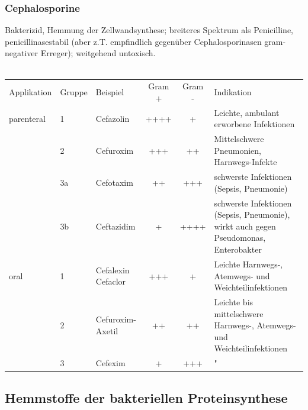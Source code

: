 \documentclass[10pt,a4paper]{report}
\begin{document}
\subsubsection{Cephalosporine} %
\label{ssub:cephalosporine}
Bakterizid, Hemmung der Zellwandsynthese; breiteres Spektrum als Penicilline, penicillinasestabil (aber z.T. empfindlich gegenüber Cephalosporinasen gram-negativer Erreger); weitgehend untoxisch. \\ \\
\begin{tabularx}{\textwidth}{lllccX}
Applikation&Gruppe&Beispiel&Gram +&Gram -&Indikation\\
parenteral&1&Cefazolin&++++&+&Leichte, ambulant erworbene Infektionen\\
&2&Cefuroxim&+++&++&Mittelschwere Pneumonien, Harnwegs-Infekte\\
&3a&Cefotaxim&++&+++&schwerste Infektionen (Sepsis, Pneumonie)\\
&3b&Ceftazidim&+&++++&schwerste Infektionen (Sepsis, Pneumonie),
wirkt auch gegen Pseudomonas, Enterobakter\\
oral&1&Cefalexin Cefaclor&+++&+&Leichte Harnwegs-, Atemwegs- und Weichteilinfektionen\\
&2&Cefuroxim-Axetil&++&++&Leichte bis mittelschwere Harnwegs-, Atemwegs- und Weichteilinfektionen\\
&3&Cefexim&+&+++&"\\
\end{tabularx}
\subsection{Hemmstoffe der bakteriellen Proteinsynthese} %
\label{sub:hemmstoffe_der_bakteriellen_proteinsynthese}
\end{document}
